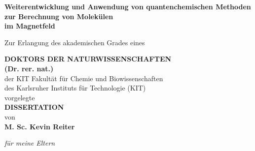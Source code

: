 \begin{titlepage}
    \begin{center}
            
        \textbf{\huge{Weiterentwicklung und Anwendung von quantenchemischen
        Methoden zur Berechnung von Molekülen}}\\ 
        \textbf{\huge{im Magnetfeld}}
        
        \vspace{1.5cm}
        Zur Erlangung des akademischen Grades eines
        
        \vspace{1.0cm}
        \textbf{\Large{DOKTORS DER NATURWISSENSCHAFTEN}}\\
        \vspace{1.cm}
        \textbf{\large{(Dr. rer. nat.)}}\\
        \vspace{1.5cm}
        der KIT Fakultät für Chemie und Biowissenschaften\\
        \vspace{0.5cm}
        des Karlsruher Instituts für Technologie (KIT)\\
        \vspace{0.5cm}
        vorgelegte \\
        \vspace{1.0cm}
        \textbf{\Large{DISSERTATION}}\\
        \vspace{1.0cm}
        von\\
        \vspace{1.0cm}
        \textbf{\large{M. Sc. Kevin Reiter}}\\
        
        \vfill        
    \end{center}
    
\newpage
\thispagestyle{empty}
\cleardoublepage

\newpage
\thispagestyle{empty}

\vspace*{\fill}
\begin{center}
\textit{für meine Eltern}
\end{center}
\vfill

\newpage
\thispagestyle{empty}
\cleardoublepage
\end{titlepage}